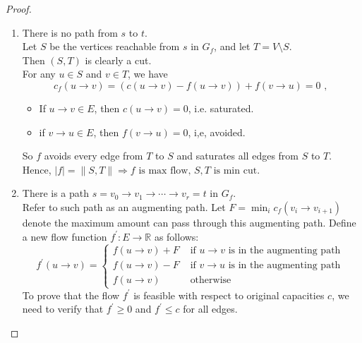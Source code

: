 \begin{proof}
\begin{enumerate}[label={Case \arabic*}, leftmargin=1in]
    \item There is no path from $s$ to $t$.\\
        Let $S$ be the vertices reachable from $s$ in $G_f$,
        and let $T = V \setminus S$. \\
        Then $(S,T)$ is clearly a cut.\\
        For any $u \in S$ and $v \in T$, we have 
        \[c_f(u \rightarrow v) = (c(u \rightarrow v) - f(u \rightarrow v)) + f(v \rightarrow u) =  0 \text{ , }\]
        \begin{itemize}
            \item If $u \rightarrow v \in E$, then $c(u \rightarrow v) = 0$, i.e. saturated.
            \item if $v \rightarrow u \in E$, then $f(v \rightarrow u) = 0$, i,e, avoided.
        \end{itemize}
        So $f$ avoids every edge from $T$ to $S$ and saturates all edges from $S$ to $T$.\\
        Hence, $|f| = \|S,T\| \Rightarrow f \text{ is max flow, } S,T \text{ is min cut. }$
    \item There is a path $s = v_0 \rightarrow v_1 \rightarrow \cdots \rightarrow v_r = t$ in $G_f$.\\
        Refer to such path as an augmenting path.
        Let $F = \min_i c_f(v_i \rightarrow v_{i+1})$ denote the maximum
        amount can pass through this augmenting path.
        Define a new flow function $f^\prime:E \rightarrow \mathbb{R}$ as follows:
        \begin{equation}
            f^\prime(u \rightarrow v) =
            \begin{cases}
                f(u \rightarrow v) + F & \text{ if } u \rightarrow v \text{ is in the augmenting path } \\
                f(u \rightarrow v) - F & \text{ if } v \rightarrow u \text{ is in the augmenting path } \\
                f(u \rightarrow v) & \text{ otherwise }
            \end{cases}
        \end{equation}
        To prove that the flow $f^\prime$ is feasible with respect to original capacities $c$,
        we need to verify that $f^\prime \geq 0$ and $f^\prime \leq c$ for all edges.


\end{enumerate}
\end{proof}
